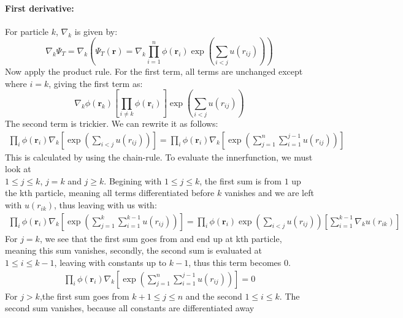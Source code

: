 \documentclass[a4paper, 10pt]{article}
\begin{document}
\begin{appendices}
		\paragraph{First derivative:}
		For particle $k$, $\nabla_k$ is given by:
		\begin{equation}
		\nabla_k\Psi_{T} = \nabla_k\left(\Psi_T(\mathbf{r})=\nabla_k \prod_{i=1}^n\phi(\mathbf{r}_i)\exp\left(\sum_{i<j} u(r_{ij})\right)\right)
		\end{equation}
		Now apply the product rule. For the first term, all terms are unchanged except where $i=k$, giving the first term as:
		\begin{equation}
		\nabla_k \phi(\mathbf{r}_k)\left[ \prod_{i\neq k} \phi(\mathbf{r}_i)\right]\exp\left(\sum_{i<j}u(r_{ij})\right)
		\end{equation}
		The second term is trickier. We can rewrite it as follows:
		\begin{align}
		\prod_{i}\phi(\boldsymbol{r}_{i})\nabla_{k}\left[\exp\left(\sum_{i < j}u(r_{ij})\right)\right]
		= \prod_{i}\phi(\boldsymbol{r}_{i})\nabla_{k}\left[\exp\left(\sum_{j = 1}^{n}\sum_{i = 1}^{j-1}u(r_{ij})\right)\right]
		\label{second term in first derivative}
		\end{align}
		This is calculated by using the chain-rule. To evaluate the innerfunction, we must look
		at \\$1 \le j \le k$, $j = k$ and $j \ge k$. Begining with $1\le  j \le k$,
		the first sum is from $1$ up the kth particle, meaning all terms differentiated before $k$ vanishes
		and we are left with $u(r_{ik})$, thus leaving with us with:
		\begin{align}
		\prod_{i}\phi(\boldsymbol{r}_{i})\nabla_{k}\left[\exp\left(\sum_{j = 1}^{k}\sum_{i = 1}^{k-1}u(r_{ij})\right)\right]
		=
		\prod_{i}\phi(\boldsymbol{r}_{i})\exp{\left(\sum_{i<j}u(r_{ij})\right)}
		\left[\sum_{i = 1}^{k-1}\nabla_{k}u(r_{ik})\right]
		\end{align}
		For $j = k$, we see that the first sum goes from and end up at kth particle, meaning
		this sum vanishes, secondly, the second sum is evaluated at $1 \le i \le k-1$, leaving with
		constants up to $k-1$, thus this term becomes $0$.
		\begin{align}
		\prod_{i}\phi(\boldsymbol{r}_{i})\nabla_{k}\left[\exp\left(\sum_{j = 1}^{n}\sum_{i = 1}^{j-1}u(r_{ij})\right)\right]
		= 0
		\end{align}
		For $j > k$,the first sum goes from $k+1\le j \le n$ and the second $1 \le i \le k$.  The second sum vanishes, because all constants are differentiated away

\end{appendices}
\end{document}
